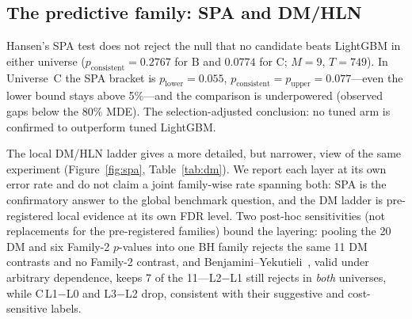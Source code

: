 \documentclass[sigconf,nonacm]{acmart}
\begin{document}
\subsection{The predictive family: SPA and DM/HLN}\label{sec:spa}
Hansen's SPA test does not reject the null that no candidate beats LightGBM in either universe ($p_{\text{consistent}}=0.2767$ for B and $0.0774$ for C; $M=9$, $T=749$). In Universe~C the SPA bracket is $p_{\text{lower}}=0.055$, $p_{\text{consistent}}=p_{\text{upper}}=0.077$---even the lower bound stays above 5\%---and the comparison is underpowered (observed gaps below the 80\% MDE). The selection-adjusted conclusion: no tuned arm is confirmed to outperform tuned LightGBM.

The local DM/HLN ladder gives a more detailed, but narrower, view of the same experiment (Figure~\ref{fig:spa}, Table~\ref{tab:dm}). We report each layer at its own error rate and do not claim a joint family-wise rate spanning both: SPA is the confirmatory answer to the global benchmark question, and the DM ladder is pre-registered local evidence at its own FDR level. Two post-hoc sensitivities (not replacements for the pre-registered families) bound the layering: pooling the 20 DM and six Family-2 $p$-values into one BH family rejects the same 11 DM contrasts and no Family-2 contrast, and Benjamini--Yekutieli~\cite{benjamini2001by}, valid under arbitrary dependence, keeps 7 of the 11---L2$-$L1 still rejects in \emph{both} universes, while C\,L1$-$L0 and L3$-$L2 drop, consistent with their suggestive and cost-sensitive labels.
\end{document}
